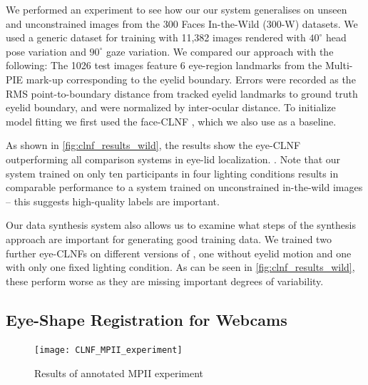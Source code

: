 

We performed an experiment to see how our our system generalises on unseen and unconstrained images from the 300 Faces In-the-Wild (300-W) \cite{sagonas2013300} datasets.
We used a generic \dataset dataset for training with 11,382 images rendered with $40^{\circ}$ head pose variation and $90^{\circ}$ gaze variation.
We compared our approach with the following: 
The 1026 test images feature 6 eye-region landmarks from the Multi-PIE \cite{gross2010multi} mark-up corresponding to the eyelid boundary. Errors were recorded as the RMS point-to-boundary distance from tracked eyelid landmarks to ground truth eyelid boundary, and were normalized by inter-ocular distance.
To initialize model fitting we first used the face-CLNF \cite{baltrusaitis2013constrained}, which we also use as a baseline.

As shown in \autoref{fig:clnf_results_wild}, the results show the eye-CLNF outperforming all comparison systems in eye-lid localization. . Note that our system trained on only ten participants in four lighting conditions results in comparable performance to a system trained on unconstrained in-the-wild images -- this suggests high-quality labels are important.

Our data synthesis system also allows us to examine what steps of the synthesis approach are important for generating good training data. We trained two further eye-CLNFs on different versions of \dataset, one without eyelid motion and one with only one fixed lighting condition. As can be seen in \autoref{fig:clnf_results_wild}, these perform worse as they are missing important degrees of variability.

\subsection{Eye-Shape Registration for Webcams}


\begin{figure}
    \centering
    \texttt{[image: CLNF\_MPII\_experiment]}
    \caption{Results of annotated MPII experiment}
    \label{fig:clnf_results_MPII}
\end{figure}



